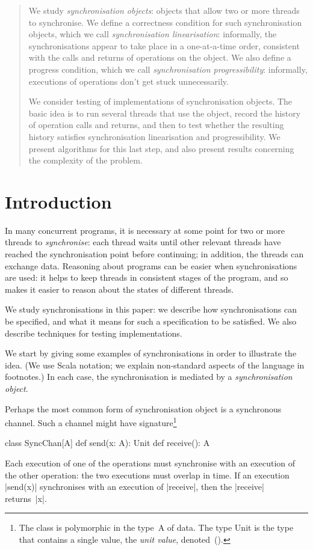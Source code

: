 \begin{abstract}
We study \emph{synchronisation objects}: objects that allow two or more
threads to synchronise.  We define a correctness condition for such
synchronisation objects, which we call \emph{synchronisation linearisation}:
informally, the synchronisations appear to take place in a one-at-a-time
order, consistent with the calls and returns of operations on the object.  We
also define a progress condition, which we call \emph{synchronisation
  progressibility}: informally, executions of operations don't get stuck
unnecessarily.

We consider testing of implementations of synchronisation objects.  The basic
idea is to run several threads that use the object, record the history of
operation calls and returns, and then to test whether the resulting history
satisfies synchronisation linearisation and progressibility.  We present
algorithms for this last step, and also present results concerning the
complexity of the problem.
\end{abstract}

\section{Introduction}

In many concurrent programs, it is necessary at some point for two or more
threads to \emph{synchronise}: each thread waits until other relevant threads
have reached the synchronisation point before continuing; in addition, the
threads can exchange data.  Reasoning about programs can be easier when
synchronisations are used: it helps to keep threads in consistent stages of
the program, and so makes it easier to reason about the states of different
threads.

We study synchronisations in this paper: we describe how synchronisations can
be specified, and what it means for such a specification to be satisfied.  We
also describe techniques for testing implementations.

We start by giving some examples of synchronisations in order to illustrate
the idea.  (We use Scala notation; we explain non-standard aspects of the
language in footnotes.)  In each case, the synchronisation is mediated by a
\emph{synchronisation object}.

Perhaps the most common form of synchronisation object is a synchronous
channel.  Such a channel might have signature\footnote{The class is
  polymorphic in the type~{\scalashape A} of data.  The type {\scalashape
    Unit} is the type that contains a single value, the \emph{unit value},
  denoted~{\scalashape ()}.}
%
\begin{scala}
class SyncChan[A]{
  def send(x: A): Unit
  def receive(): A
}
\end{scala}
%
Each execution of one of the operations must synchronise with an execution
of the other operation: the two executions must overlap in time.  If an
execution |send(x)| synchronises with an execution of |receive|, then the
|receive| returns~|x|.

